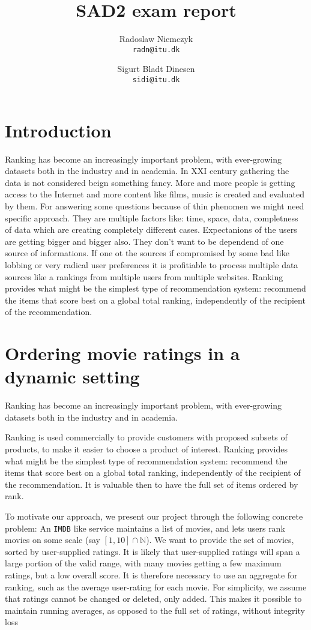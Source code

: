 \documentclass[a4paper, titlepage]{report}
\renewcommand{\%}{\scalebox{.9}{\oldpct}}
\begin{document}
\title{SAD2 exam report}
\author{
	Radoslaw Niemczyk
	\\\texttt{radn@itu.dk}
	\and
	Sigurt Bladt Dinesen
	\\\texttt{sidi@itu.dk}
}

\maketitle

\section*{Introduction}
Ranking has become an increasingly important problem, with ever-growing datasets
both in the industry and in academia. In XXI century gathering the data is not
considered beign something fancy. More and more people is getting access to the
Internet and more content like films, music is created and evaluated by them.
For answering some questions because of thin phenomen
we might need specific approach. They are multiple factors
like: time, space, data, completness of data which are creating completely different
cases.
Expectanions of the users are getting bigger and bigger also. They don't want to
be dependend of one source of informations. If one ot the sources if compromised
by some bad like lobbing or very radical user preferences it is profitiable to
process multiple data sources like a rankings from multiple users from multiple
websites.
Ranking provides what might be the simplest type of recommendation system:
recommend the items that score best on a global total ranking, independently of
the recipient of the recommendation.
\section*{Ordering movie ratings in a dynamic setting}
Ranking has become an increasingly important problem, with ever-growing datasets
both in the industry and in academia.

Ranking is used commercially to provide customers with proposed subsets of
products, to make it easier to choose a product of interest.
Ranking provides what might be the simplest type of recommendation system:
recommend the items that score best on a global total ranking, independently of
the recipient of the recommendation.
It is valuable then to have the full set of items ordered by
rank.

To motivate our approach, we present our project through the following concrete
problem: An \texttt{IMDB} like service maintains a list of movies, and lets
users rank movies on some scale (say $\left[1,10\right]\cap \mathbb{N}$). We
want to provide the set of movies, sorted by user-supplied ratings. It is likely
that  user-supplied ratings will span a large portion of the valid range, with
many movies getting a few maximum ratings, but a low overall score. It is
therefore necessary to use an aggregate for ranking, such as the average
user-rating for each movie. For simplicity, we assume that ratings cannot be
changed or deleted, only added. This makes it possible to maintain running
averages, as
opposed to the full set of ratings, without integrity loss
\end{document}
